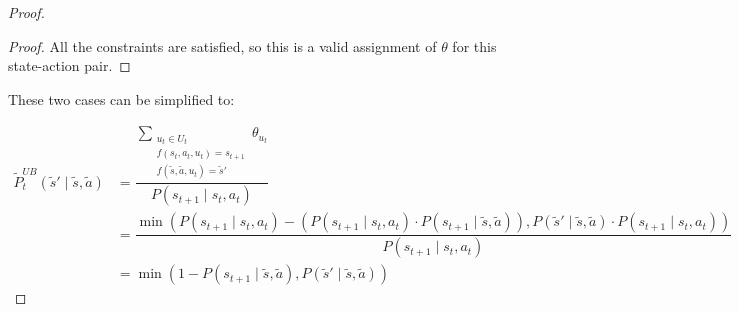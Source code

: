 \begin{proof}
\begin{proof}
All the constraints are satisfied, so this is a valid assignment of $\theta$ for this state-action pair.
\end{proof}

These two cases can be simplified to:

\begin{align*}
\tilde{P}_{t}^{UB}(\tilde{s}' \mid \tilde{s}, \tilde{a}) &= \dfrac{\sum_{\substack{u_t \in U_t \\f(s_t, a_t, u_t) = s_{t+1} \\ f(\tilde{s}, \tilde{a}, u_t) = \tilde{s}'}}{\theta_{u_t}}}{P(s_{t+1} \mid s_t, a_t)}\\ &=
 \dfrac{\min(P(s_{t+1} \mid s_t, a_t) - (P(s_{t+1} \mid s_t, a_t) \cdot P(s_{t+1} \mid \tilde{s}, \tilde{a})), P(\tilde{s}' \mid \tilde{s}, \tilde{a}) \cdot P(s_{t+1} \mid s_t, a_t))}{P(s_{t+1} \mid s_t, a_t)}\\
 &= \min(1 - P(s_{t+1} \mid \tilde{s}, \tilde{a}), P(\tilde{s}' \mid \tilde{s}, \tilde{a}))
\end{align*}
\end{proof}